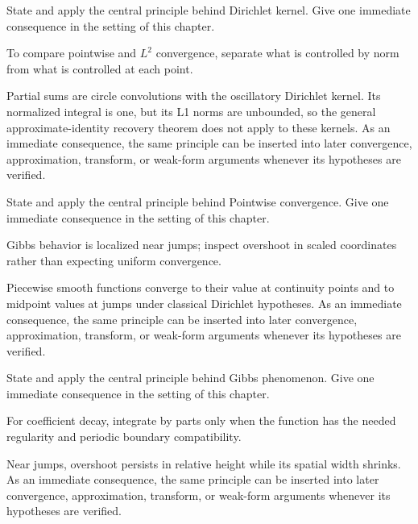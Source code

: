 \begin{exercise}\label{exr:iii09-06}
State and apply the central principle behind Dirichlet kernel. Give one immediate consequence in the setting of this chapter.
\end{exercise}
\begin{hint}
To compare pointwise and \(L^2\) convergence, separate what is controlled by norm from what is controlled at each point.
\end{hint}
\begin{solution}
Partial sums are circle convolutions with the oscillatory Dirichlet kernel. Its normalized integral is one, but its L1 norms are unbounded, so the general approximate-identity recovery theorem does not apply to these kernels. As an immediate consequence, the same principle can be inserted into later convergence, approximation, transform, or weak-form arguments whenever its hypotheses are verified.
\end{solution}

\begin{exercise}\label{exr:iii09-07}
State and apply the central principle behind Pointwise convergence. Give one immediate consequence in the setting of this chapter.
\end{exercise}
\begin{hint}
Gibbs behavior is localized near jumps; inspect overshoot in scaled coordinates rather than expecting uniform convergence.
\end{hint}
\begin{solution}
Piecewise smooth functions converge to their value at continuity points and to midpoint values at jumps under classical Dirichlet hypotheses. As an immediate consequence, the same principle can be inserted into later convergence, approximation, transform, or weak-form arguments whenever its hypotheses are verified.
\end{solution}

\begin{exercise}\label{exr:iii09-08}
State and apply the central principle behind Gibbs phenomenon. Give one immediate consequence in the setting of this chapter.
\end{exercise}
\begin{hint}
For coefficient decay, integrate by parts only when the function has the needed regularity and periodic boundary compatibility.
\end{hint}
\begin{solution}
Near jumps, overshoot persists in relative height while its spatial width shrinks. As an immediate consequence, the same principle can be inserted into later convergence, approximation, transform, or weak-form arguments whenever its hypotheses are verified.
\end{solution}


